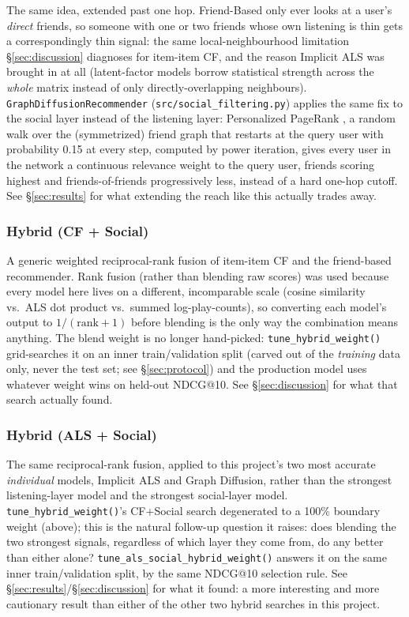 \documentclass[11pt,a4paper]{article}
\newcommand{\code}[1]{\texttt{#1}}
\newcommand{\secref}[1]{\S\ref{#1}}
\begin{document}
The same idea, extended past one hop. Friend-Based only ever looks at a user's \emph{direct} friends, so someone with one or two friends whose own listening is thin gets a correspondingly thin signal: the same local-neighbourhood limitation \secref{sec:discussion} diagnoses for item-item CF, and the reason Implicit ALS was brought in at all (latent-factor models borrow statistical strength across the \emph{whole} matrix instead of only directly-overlapping neighbours). \code{GraphDiffusionRecommender} (\code{src/social\_filtering.py}) applies the same fix to the social layer instead of the listening layer: Personalized PageRank \citep{page1999pagerank}, a random walk over the (symmetrized) friend graph that restarts at the query user with probability 0.15 at every step, computed by power iteration, gives every user in the network a continuous relevance weight to the query user, friends scoring highest and friends-of-friends progressively less, instead of a hard one-hop cutoff. See \secref{sec:results} for what extending the reach like this actually trades away.

\subsubsection{Hybrid (CF + Social)}

A generic weighted reciprocal-rank fusion of item-item CF and the friend-based recommender. Rank fusion (rather than blending raw scores) was used because every model here lives on a different, incomparable scale (cosine similarity vs.\ ALS dot product vs.\ summed log-play-counts), so converting each model's output to $1/(\text{rank}+1)$ before blending is the only way the combination means anything. The blend weight is no longer hand-picked: \code{tune\_hybrid\_weight()} grid-searches it on an inner train/validation split (carved out of the \emph{training} data only, never the test set; see \secref{sec:protocol}) and the production model uses whatever weight wins on held-out NDCG@10. See \secref{sec:discussion} for what that search actually found.

\subsubsection{Hybrid (ALS + Social)}

The same reciprocal-rank fusion, applied to this project's two most accurate \emph{individual} models, Implicit ALS and Graph Diffusion, rather than the strongest listening-layer model and the strongest social-layer model. \code{tune\_hybrid\_weight()}'s CF+Social search degenerated to a 100\% boundary weight (above); this is the natural follow-up question it raises: does blending the two strongest signals, regardless of which layer they come from, do any better than either alone? \code{tune\_als\_social\_hybrid\_weight()} answers it on the same inner train/validation split, by the same NDCG@10 selection rule. See \secref{sec:results}/\secref{sec:discussion} for what it found: a more interesting and more cautionary result than either of the other two hybrid searches in this project.
\end{document}
